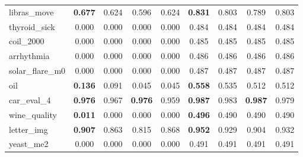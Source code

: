 \begin{figure}[ht]
\begin{tabular}{p{22mm}|*4{p{14mm}}|*4{p{14mm}}}
        libras\_move&\multicolumn{1}{c}{\textbf{0.677}}&\multicolumn{1}{c}{0.624}&\multicolumn{1}{c}{0.596}&\multicolumn{1}{c|}{0.624}&\multicolumn{1}{c}{\textbf{0.831}}&\multicolumn{1}{c}{0.803}&\multicolumn{1}{c}{0.789}&\multicolumn{1}{c}{0.803}\\
        thyroid\_sick&\multicolumn{1}{c}{0.000}&\multicolumn{1}{c}{0.000}&\multicolumn{1}{c}{0.000}&\multicolumn{1}{c|}{0.000}&\multicolumn{1}{c}{0.484}&\multicolumn{1}{c}{0.484}&\multicolumn{1}{c}{0.484}&\multicolumn{1}{c}{0.484}\\
        coil\_2000&\multicolumn{1}{c}{0.000}&\multicolumn{1}{c}{0.000}&\multicolumn{1}{c}{0.000}&\multicolumn{1}{c|}{0.000}&\multicolumn{1}{c}{0.485}&\multicolumn{1}{c}{0.485}&\multicolumn{1}{c}{0.485}&\multicolumn{1}{c}{0.485}\\
        arrhythmia&\multicolumn{1}{c}{0.000}&\multicolumn{1}{c}{0.000}&\multicolumn{1}{c}{0.000}&\multicolumn{1}{c|}{0.000}&\multicolumn{1}{c}{0.486}&\multicolumn{1}{c}{0.486}&\multicolumn{1}{c}{0.486}&\multicolumn{1}{c}{0.486}\\
        solar\_flare\_m0&\multicolumn{1}{c}{0.000}&\multicolumn{1}{c}{0.000}&\multicolumn{1}{c}{0.000}&\multicolumn{1}{c|}{0.000}&\multicolumn{1}{c}{0.487}&\multicolumn{1}{c}{0.487}&\multicolumn{1}{c}{0.487}&\multicolumn{1}{c}{0.487}\\
        oil&\multicolumn{1}{c}{\textbf{0.136}}&\multicolumn{1}{c}{0.091}&\multicolumn{1}{c}{0.045}&\multicolumn{1}{c|}{0.045}&\multicolumn{1}{c}{\textbf{0.558}}&\multicolumn{1}{c}{0.535}&\multicolumn{1}{c}{0.512}&\multicolumn{1}{c}{0.512}\\
        car\_eval\_4&\multicolumn{1}{c}{\textbf{0.976}}&\multicolumn{1}{c}{0.967}&\multicolumn{1}{c}{\textbf{0.976}}&\multicolumn{1}{c|}{0.959}&\multicolumn{1}{c}{\textbf{0.987}}&\multicolumn{1}{c}{0.983}&\multicolumn{1}{c}{\textbf{0.987}}&\multicolumn{1}{c}{0.979}\\
        wine\_quality&\multicolumn{1}{c}{\textbf{0.011}}&\multicolumn{1}{c}{0.000}&\multicolumn{1}{c}{0.000}&\multicolumn{1}{c|}{0.000}&\multicolumn{1}{c}{\textbf{0.496}}&\multicolumn{1}{c}{0.490}&\multicolumn{1}{c}{0.490}&\multicolumn{1}{c}{0.490}\\
        letter\_img&\multicolumn{1}{c}{\textbf{0.907}}&\multicolumn{1}{c}{0.863}&\multicolumn{1}{c}{0.815}&\multicolumn{1}{c|}{0.868}&\multicolumn{1}{c}{\textbf{0.952}}&\multicolumn{1}{c}{0.929}&\multicolumn{1}{c}{0.904}&\multicolumn{1}{c}{0.932}\\
        yeast\_me2&\multicolumn{1}{c}{0.000}&\multicolumn{1}{c}{0.000}&\multicolumn{1}{c}{0.000}&\multicolumn{1}{c|}{0.000}&\multicolumn{1}{c}{0.491}&\multicolumn{1}{c}{0.491}&\multicolumn{1}{c}{0.491}&\multicolumn{1}{c}{0.491}\\

\end{tabular}
\end{figure}
